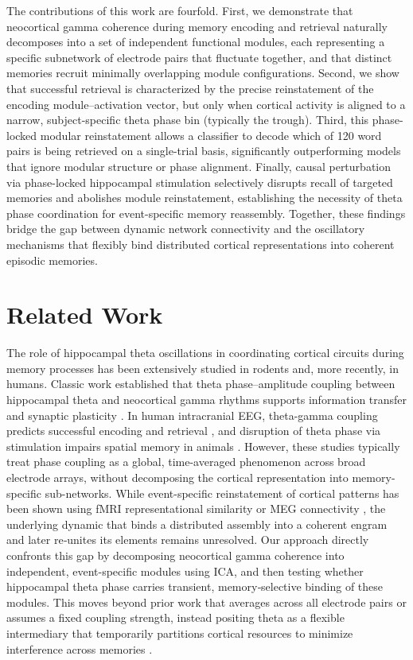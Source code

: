 \documentclass{article}
\begin{document}
The contributions of this work are fourfold. First, we demonstrate that neocortical gamma coherence during memory encoding and retrieval naturally decomposes into a set of independent functional modules, each representing a specific subnetwork of electrode pairs that fluctuate together, and that distinct memories recruit minimally overlapping module configurations. Second, we show that successful retrieval is characterized by the precise reinstatement of the encoding module–activation vector, but only when cortical activity is aligned to a narrow, subject-specific theta phase bin (typically the trough). Third, this phase-locked modular reinstatement allows a classifier to decode which of 120 word pairs is being retrieved on a single-trial basis, significantly outperforming models that ignore modular structure or phase alignment. Finally, causal perturbation via phase-locked hippocampal stimulation selectively disrupts recall of targeted memories and abolishes module reinstatement, establishing the necessity of theta phase coordination for event-specific memory reassembly. Together, these findings bridge the gap between dynamic network connectivity and the oscillatory mechanisms that flexibly bind distributed cortical representations into coherent episodic memories.

\section{Related Work}

The role of hippocampal theta oscillations in coordinating cortical circuits during memory processes has been extensively studied in rodents and, more recently, in humans. 
Classic work established that theta phase–amplitude coupling between hippocampal theta and neocortical gamma rhythms supports information transfer and synaptic plasticity \cite{Buzsaki2002Theta,Canolty2006HighGamma}. 
In human intracranial EEG, theta-gamma coupling predicts successful encoding and retrieval \cite{Staresina2015Reinstatement,Fell2010MedialTemporal}, and disruption of theta phase via stimulation impairs spatial memory in animals \cite{Manns2007Hippocampal}. 
However, these studies typically treat phase coupling as a global, time-averaged phenomenon across broad electrode arrays, without decomposing the cortical representation into memory-specific sub-networks. 
While event-specific reinstatement of cortical patterns has been shown using fMRI representational similarity \cite{Ritchey2020Cortical} or MEG connectivity \cite{Johnson2020Replay}, the underlying dynamic that binds a distributed assembly into a coherent engram and later re‑unites its elements remains unresolved. 
Our approach directly confronts this gap by decomposing neocortical gamma coherence into independent, event-specific modules using ICA, and then testing whether hippocampal theta phase carries transient, memory‑selective binding of these modules. 
This moves beyond prior work that averages across all electrode pairs or assumes a fixed coupling strength, instead positing theta as a flexible intermediary that temporarily partitions cortical resources to minimize interference across memories \cite{Norman2006Complementary}.
\end{document}
